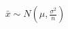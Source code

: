 \documentclass[preview]{standalone}
\begin{document}
\begin{align*}
\bar{x} \sim N( \mu , \frac{\sigma^2}{ n })
\end{align*}
\end{document}
